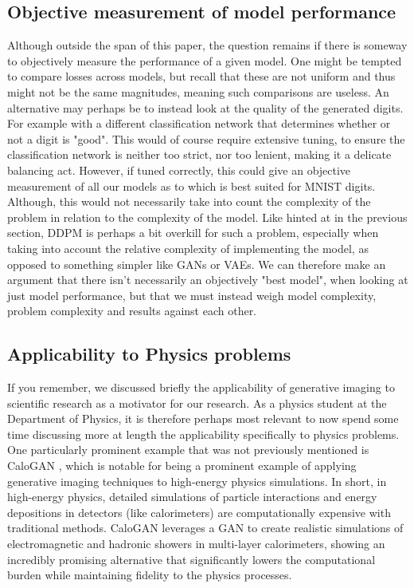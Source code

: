 \documentclass{article}
\begin{document}
\subsection{Objective measurement of model performance}
Although outside the span of this paper, the question remains if there is someway to objectively measure the performance of a given model. One might be tempted to compare losses across models, but recall that these are not uniform and thus might not be the same magnitudes, meaning such comparisons are useless.
\newline
An alternative may perhaps be to instead look at the quality of the generated digits. For example with a different classification network that determines whether or not a digit is "good". This would of course require extensive tuning, to ensure the classification network is neither too strict, nor too lenient, making it a delicate balancing act. 
\newline
However, if tuned correctly, this could give an objective measurement of all our models as to which is best suited for MNIST digits. \newline
Although, this would not necessarily take into count the complexity of the problem in relation to the complexity of the model. Like hinted at in the previous section, DDPM is perhaps a bit overkill for such a problem, especially when taking into account the relative complexity of implementing the model, as opposed to something simpler like GANs or VAEs. We can therefore make an argument that there isn't necessarily an objectively "best model", when looking at just model performance, but that we must instead weigh model complexity, problem complexity and results against each other.
\subsection{Applicability to Physics problems}
If you remember, we discussed briefly the applicability of generative imaging to scientific research as a motivator for our research. As a physics student at the Department of Physics, it is therefore perhaps most relevant to now spend some time discussing more at length the applicability specifically to physics problems. \newline
One particularly prominent example that was not previously mentioned is CaloGAN \cite{Paganini_2018}, which is notable for being a prominent example of applying generative imaging techniques to high-energy physics simulations. \newline
In short, in high-energy physics, detailed simulations of particle interactions and energy depositions in detectors (like calorimeters) are computationally expensive with traditional methods. CaloGAN leverages a GAN to create realistic simulations of electromagnetic and hadronic showers in multi-layer calorimeters, showing an incredibly promising alternative that significantly lowers the computational burden while maintaining fidelity to the physics processes.
\end{document}
